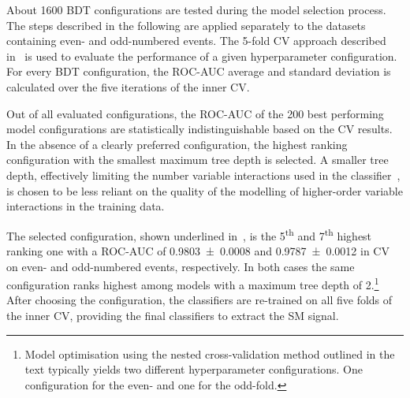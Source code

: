 About 1600 BDT configurations are tested during the model selection process. The
steps described in the following are applied separately to the datasets
containing even- and odd-numbered events. The 5-fold CV approach described
in~ is used to evaluate the performance of a given
hyperparameter configuration. For every BDT configuration, the ROC-AUC average
and standard deviation is calculated over the five iterations of the inner CV.

Out of all evaluated configurations, the ROC-AUC of the 200 best performing
model configurations are statistically indistinguishable based on the CV
results. In the absence of a clearly preferred configuration, the highest
ranking configuration with the smallest maximum tree depth is selected. A
smaller tree depth, effectively limiting the number variable interactions used
in the classifier~\cite{hastie09}, is chosen to be less reliant on the quality
of the modelling of higher-order variable interactions in the training data.

The selected configuration, shown underlined
in~, is the 5\textsuperscript{th}
and 7\textsuperscript{th} highest ranking one with a ROC-AUC of
\num{0.9803 +- 0.0008} and \num{0.9787 +- 0.0012} in CV on even- and
odd-numbered events, respectively. In both cases the same
configuration ranks highest among models with a maximum tree depth of
2.\footnote{Model optimisation using the nested cross-validation
  method outlined in the text typically yields two different
  hyperparameter configurations. One configuration for the even- and
  one for the odd-fold.} After choosing the configuration, the
classifiers are re-trained on all five folds of the inner CV,
providing the final classifiers to extract the SM \HH signal.




